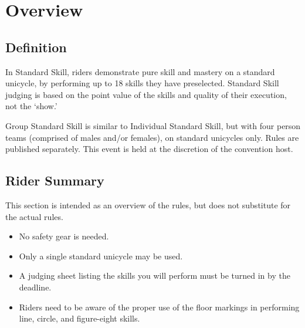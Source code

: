 \chapter{Overview}

\section{Definition}

In Standard Skill, riders demonstrate pure skill and mastery on a standard unicycle, by performing up to 18 skills they have preselected.
Standard Skill judging is based on the point value of the skills and quality of their execution, not the `show.'

Group Standard Skill is similar to Individual Standard Skill, but with four person teams (comprised of males and/or females), on standard unicycles only.
Rules are published separately.
This event is held at the discretion of the convention host.

\section{Rider Summary}

This section is intended as an overview of the rules, but does not
substitute for the actual rules.
\begin{itemize}
\item No safety gear is needed.
\item Only a single standard unicycle may be used.
\item A judging sheet listing the skills you will perform must be turned
in by the deadline.
\item Riders need to be aware of the proper use of the floor markings in 
performing line, circle, and figure-eight skills.
\end{itemize}
